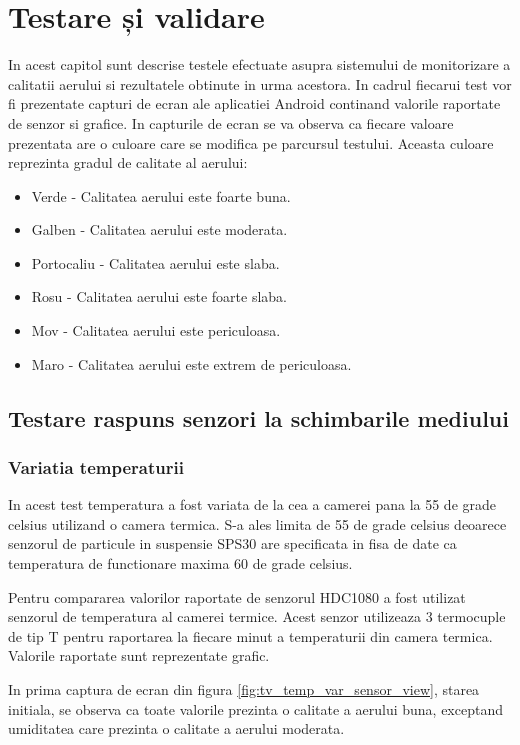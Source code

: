 \chapter{Testare și validare}
\pagestyle{fancy}

In acest capitol sunt descrise testele efectuate asupra sistemului de monitorizare a calitatii aerului si rezultatele obtinute in urma acestora. In cadrul fiecarui 
test vor fi prezentate capturi de ecran ale aplicatiei Android continand valorile raportate de senzor si grafice. In capturile de ecran se va observa ca fiecare 
valoare prezentata are o culoare care se modifica pe parcursul testului. Aceasta culoare reprezinta gradul de calitate al aerului:
\begin{itemize}
	\item Verde - Calitatea aerului este foarte buna.
	\item Galben - Calitatea aerului este moderata.
	\item Portocaliu - Calitatea aerului este slaba. 
	\item Rosu - Calitatea aerului este foarte slaba.
	\item Mov - Calitatea aerului este periculoasa.
	\item Maro - Calitatea aerului este extrem de periculoasa.
\end{itemize}

\section{Testare raspuns senzori la schimbarile mediului}\label{sec:tv_environmental_variation}
\subsection{Variatia temperaturii}\label{subsec:tv_temperature_variation}
In acest test temperatura a fost variata de la cea a camerei pana la 55 de grade celsius utilizand o camera termica. S-a ales limita de 55 de grade celsius deoarece 
senzorul de particule in suspensie SPS30 are specificata in fisa de date ca temperatura de functionare maxima 60 de grade celsius.

Pentru compararea valorilor raportate de senzorul HDC1080 a fost utilizat senzorul de temperatura al camerei termice. Acest senzor utilizeaza 3 termocuple de tip T 
pentru raportarea la fiecare minut a temperaturii din camera termica. Valorile raportate sunt reprezentate grafic.

In prima captura de ecran din figura \ref{fig:tv_temp_var_sensor_view}, starea initiala, se observa ca toate valorile prezinta o calitate a aerului buna, exceptand umiditatea care prezinta o calitate a aerului 
moderata. 

